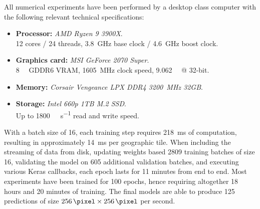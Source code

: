 All numerical experiments have been performed by a desktop class computer with the following relevant technical specifications:

\begin{itemize}[noitemsep]
  \item \textbf{Processor:} \textit{AMD Ryzen 9 3900X}. \\
    12 cores / 24 threads, \SI{3.8}{\giga\hertz} base clock / \SI{4.6}{\giga\hertz} boost clock.
  \item \textbf{Graphics card:} \textit{MSI GeForce 2070 Super}. \\
    \SI{8}{\giga\byte} GDDR6 VRAM, \SI{1605}{\mega\hertz} clock speed, \SI{9.062}{\tera\flops} @ 32-bit.
  \item \textbf{Memory:} \textit{Corsair Vengeance LPX DDR4 \SI{3200}{\mega\hertz} 32GB}.
  \item \textbf{Storage:} \textit{Intel 660p 1TB M.2 SSD}. \\
    Up to \SI{1800}{\mega\byte\per\second} read and write speed.
\end{itemize}

\begin{wrapfigure}[8]{r}{.4\textwidth}
  \vspace{-0.75\baselineskip}
\end{wrapfigure}
\noindent
With a batch size of 16, each training step requires \SI{218}{\milli\second} of computation, resulting in approximately \SI{14}{\milli\second} per geographic tile.
When including the streaming of data from disk, updating weights based \num{2809} training batches of size 16, validating the model on \num{605} additional validation batches, and executing various Keras callbacks, each epoch lasts for 11 minutes from end to end.
Most experiments have been trained for 100 epochs, hence requiring altogether 18 hours and 20 minutes of training.
The final models are able to produce 125 predictions of size $\SI{256}{\pixel} \times \SI{256}{\pixel}$ per second.
